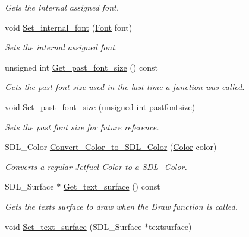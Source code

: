 \begin{DoxyCompactItemize}
\begin{DoxyCompactList}\small\item\em Gets the internal assigned font. \end{DoxyCompactList}\item 
void \hyperlink{classjetfuel_1_1draw_1_1Text_ae52e5068a74da2daaa78fffeed5e4dc3}{Set\+\_\+internal\+\_\+font} (\hyperlink{classjetfuel_1_1draw_1_1Font}{Font} font)
\begin{DoxyCompactList}\small\item\em Sets the internal assigned font. \end{DoxyCompactList}\item 
unsigned int \hyperlink{classjetfuel_1_1draw_1_1Text_ab24383675fab628744a31d8d95934d6f}{Get\+\_\+past\+\_\+font\+\_\+size} () const
\begin{DoxyCompactList}\small\item\em Gets the past font size used in the last time a function was called. \end{DoxyCompactList}\item 
void \hyperlink{classjetfuel_1_1draw_1_1Text_a1d4519c1b6366a1be4a5168eadffd818}{Set\+\_\+past\+\_\+font\+\_\+size} (unsigned int pastfontsize)
\begin{DoxyCompactList}\small\item\em Sets the past font size for future reference. \end{DoxyCompactList}\item 
S\+D\+L\+\_\+\+Color \hyperlink{classjetfuel_1_1draw_1_1Text_a86075093466a1a7feef9675694e5b014}{Convert\+\_\+\+Color\+\_\+to\+\_\+\+S\+D\+L\+\_\+\+Color} (\hyperlink{classjetfuel_1_1draw_1_1Color}{Color} color)
\begin{DoxyCompactList}\small\item\em Converts a regular Jetfuel \hyperlink{classjetfuel_1_1draw_1_1Color}{Color} to a S\+D\+L\+\_\+\+Color. \end{DoxyCompactList}\item 
S\+D\+L\+\_\+\+Surface $\ast$ \hyperlink{classjetfuel_1_1draw_1_1Text_ab1b5195b8431f794aad7156583992dc9}{Get\+\_\+text\+\_\+surface} () const
\begin{DoxyCompactList}\small\item\em Gets the text\textquotesingle{}s surface to draw when the Draw function is called. \end{DoxyCompactList}\item 
void \hyperlink{classjetfuel_1_1draw_1_1Text_a4d9c3cd635737cfde913f9b4015b181e}{Set\+\_\+text\+\_\+surface} (S\+D\+L\+\_\+\+Surface $\ast$textsurface)

\end{DoxyCompactItemize}
